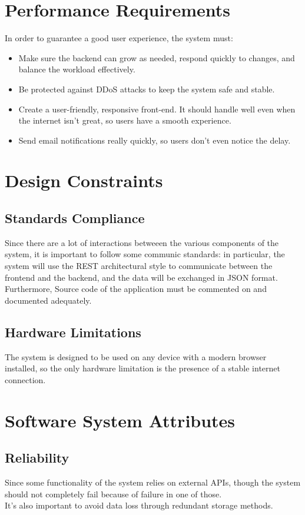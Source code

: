 \section{Performance Requirements}
In order to guarantee a good user experience, the system must:

\begin{itemize}
    \item Make sure the backend can grow as needed, respond quickly to changes, and balance the workload effectively.
    \item Be protected against DDoS attacks to keep the system safe and stable.
    \item Create a user-friendly, responsive front-end. It should handle well even when the internet isn't great, so users have a smooth experience.
    \item Send email notifications really quickly, so users don't even notice the delay.
\end{itemize}

\section{Design Constraints}

\subsection*{Standards Compliance}
Since there are a lot of interactions betweeen the various components of the system, it is important to follow some communic standards:
in particular, the system will use the REST architectural style to communicate between the frontend and the backend, and the data will be exchanged in JSON format.\\
Furthermore, Source code of the application must be commented on and documented adequately.

\subsection*{Hardware Limitations}
The system is designed to be used on any device with a modern browser installed, so the only hardware limitation is the presence of a stable internet connection.

\section{Software System Attributes}
\subsection{Reliability}
Since some functionality of the system relies on external APIs, though the system should not completely fail because of failure in one of those.\\
It's also important to avoid data loss through redundant storage methods.

